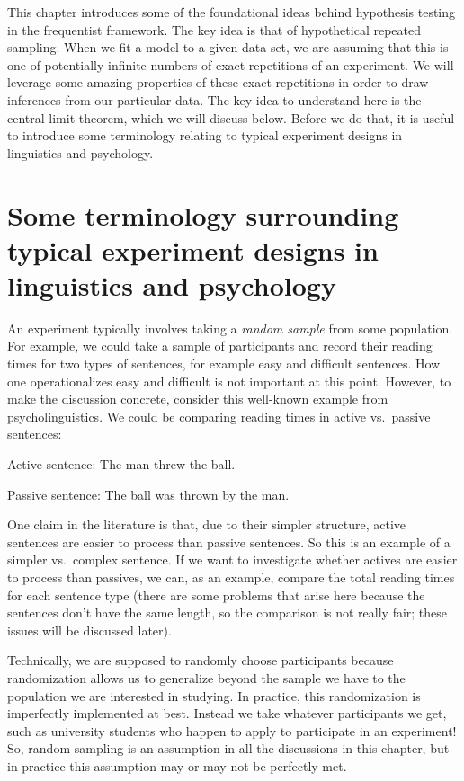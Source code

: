 \documentclass[
  12pt,
]{krantz}
\theoremstyle{definition}
\theoremstyle{definition}
\theoremstyle{definition}
\theoremstyle{definition}
\theoremstyle{remark}
\begin{document}
This chapter introduces some of the foundational ideas behind hypothesis testing in the frequentist framework. The key idea is that of hypothetical repeated sampling. When we fit a model to a given data-set, we are assuming that this is one of potentially infinite numbers of exact repetitions of an experiment. We will leverage some amazing properties of these exact repetitions in order to draw inferences from our particular data. The key idea to understand here is the central limit theorem, which we will discuss below. Before we do that, it is useful to introduce some terminology relating to typical experiment designs in linguistics and psychology.

\hypertarget{some-terminology-surrounding-typical-experiment-designs-in-linguistics-and-psychology}{%
\section{Some terminology surrounding typical experiment designs in linguistics and psychology}\label{some-terminology-surrounding-typical-experiment-designs-in-linguistics-and-psychology}}

An experiment typically involves taking a \emph{random sample} from some population. For example, we could take a sample of participants and record their reading times for two types of sentences, for example easy and difficult sentences. How one operationalizes easy and difficult is not important at this point. However, to make the discussion concrete, consider this well-known example from psycholinguistics. We could be comparing reading times in active vs.~passive sentences:

Active sentence: The man threw the ball.

Passive sentence: The ball was thrown by the man.

One claim in the literature is that, due to their simpler structure, active sentences are easier to process than passive sentences. So this is an example of a simpler vs.~complex sentence. If we want to investigate whether actives are easier to process than passives, we can, as an example, compare the total reading times for each sentence type (there are some problems that arise here because the sentences don't have the same length, so the comparison is not really fair; these issues will be discussed later).

Technically, we are supposed to randomly choose participants because randomization allows us to generalize beyond the sample we have to the population we are interested in studying. In practice, this randomization is imperfectly implemented at best. Instead we take whatever participants we get, such as university students who happen to apply to participate in an experiment! So, random sampling is an assumption in all the discussions in this chapter, but in practice this assumption may or may not be perfectly met.
\end{document}
